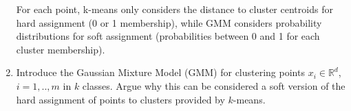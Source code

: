 \documentclass[a4paper,11pt,oneside]{book}
\begin{document}
\begin{enumerate}
\begin{solution}
                For each point, k-means only considers the distance to cluster centroids for hard assignment (0 or 1 membership), while GMM considers probability distributions for soft assignment (probabilities between 0 and 1 for each cluster membership).
            \end{solution}
        \item Introduce the Gaussian Mixture Model (GMM) for clustering points $x_i \in \mathbb{R}^d$, $i = 1,..,m$ in $k$ classes. Argue why this can be considered a soft version of the hard assignment of points to clusters provided by $k$-means.
    \end{enumerate}
\end{document}
